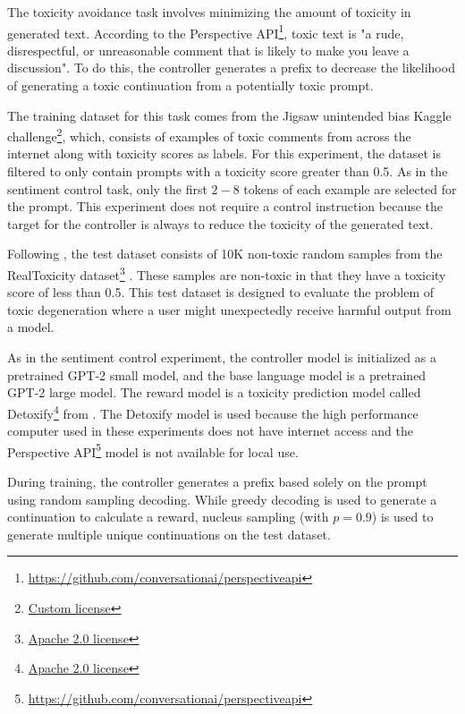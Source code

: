 \documentclass[phd,electronic,oneside,twosidetoc,letterpaper,chaptercenter,parttop,lof]{byumsphd}
\begin{document}
The toxicity avoidance task involves minimizing the amount of toxicity in generated text. According to the Perspective API\footnote{\href{https://github.com/conversationai/perspectiveapi}{https://github.com/conversationai/perspectiveapi}}, toxic text is "a rude, disrespectful, or unreasonable comment that is likely to make you leave a discussion".
To do this, the controller generates a prefix to decrease the likelihood of generating a toxic continuation from a potentially toxic prompt.

The training dataset for this task comes from the Jigsaw unintended bias Kaggle challenge\footnote{\href{https://www.kaggle.com/competitions/jigsaw-unintended-bias-in-toxicity-classification/rules}{Custom license}}, which, consists of examples of toxic comments from across the internet along with toxicity scores as labels. 
For this experiment, the dataset is filtered to only contain prompts with a toxicity score greater than 0.5. 
As in the sentiment control task, only the first $2-8$ tokens of each example are selected for the prompt. 
This experiment does not require a control instruction because the target for the controller is always to reduce the toxicity of the generated text.

Following \citet{liu2021dexpert}, the test dataset consists of 10K non-toxic random samples from the RealToxicity dataset\footnote{\href{https://huggingface.co/datasets/allenai/real-toxicity-prompts}{Apache 2.0 license}} \cite{gehman2020toxicity}. 
These samples are non-toxic in that they have a toxicity score of less than 0.5.
This test dataset is designed to evaluate the problem of toxic degeneration \citep{sheng2019bias} where a user might unexpectedly receive harmful output from a model.

As in the sentiment control experiment, the controller model is initialized as a pretrained GPT-2 small model, and the base language model is a pretrained GPT-2 large model. 
The reward model is a toxicity prediction model called Detoxify\footnote{\href{https://github.com/unitaryai/detoxify/blob/master/LICENSE}{Apache 2.0 license}} from \citet{hanu2020detoxify}. 
The Detoxify model is used because the high performance computer used in these experiments does not have internet access and the Perspective API\footnote{\href{https://github.com/conversationai/perspectiveapi}{https://github.com/conversationai/perspectiveapi}} model is not available for local use. 

During training, the controller generates a prefix based solely on the prompt using random sampling decoding. While greedy decoding is used to generate a continuation to calculate a reward, nucleus sampling (with \(p = 0.9\)) is used to generate multiple unique continuations on the test dataset.
\end{document}
